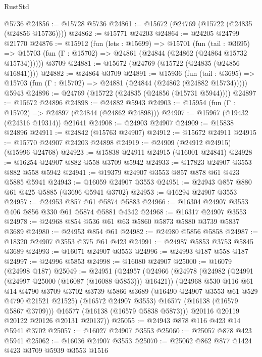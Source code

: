 \begin{lexlean}{RustStd}
\begin{coremodule}
    @5736
@24856 := @15728 @5736
@24861 := @15672 (@24769 (@15722 (@24835 (@24856 @15736))))
@24862 := @15771 @24203
@24864 := @24205 @24799 @21770
@24876 := @15912
    (fun (lets : @15699) =>
    @15701
      (fun (tail : @3695) =>
      @15703 (fun (Γ : @15702) => @24861 (@24844 (@24862 (@24864 @15732 @15734))))))
    @3709
@24881 := @15672 (@24769 (@15722 (@24835 (@24856 @16841))))
@24882 := @24864 @3709
@24891 := @15936
    (fun (tail : @3695) => @15703 (fun (Γ : @15702) => @24881 (@24844 (@24862 (@24882 @15734)))))
    @5943
@24896 := @24769 (@15722 (@24835 (@24856 (@15731 @5944))))
@24897 := @15672 @24896
@24898 := @24882 @5943
@24903 := @15954 (fun (Γ : @15702) => @24897 (@24844 (@24862 @24898)))
@24907 := @15967 (@19432 (@24316 @19314)) @21641
@24908 := @24903 @24907
@24909 := @15838 @24896
@24911 := @24842 (@15763 @24907)
@24912 := @15672 @24911
@24915 := @15770 @24907 @24203 @24898
@24919 := @24909 (@24912 @24915) (@15996 @24768)
@24923 := @15838 @24911 @24915 (@16001 @24841)
@24928 := @16254 @24907 @882 @558 @3709 @5942
@24933 := @17823 @24907 @3553 @882 @558 @5942
@24941 := @19379 @24907 @3553 @857 @878 @61 @423 @5885 @5941
@24943 := @16059 @24907 @3553
@24951 := @24943 @857 @880 @61 @425 @5885 (@3696 @5941 @3702)
@24953 := @16294 @24907 @3553
@24957 := @24953 @857 @61 @5874 @5883
@24966 := @16304 @24907 @3553 @406 @856 @330 @61 @5874 @5881 @4342
@24968 := @16317 @24907 @3553
@24978 := @24968 @854 @536 @61 @63 @5860 @5873 @5880 @3739 @5837 @3689
@24980 := @24953 @854 @61
@24982 := @24980 @5856 @5858
@24987 := @18320 @24907 @3553 @375 @61 @423
@24991 := @24987 @5853 @3753 @5845 @3689
@24993 := @16071 @24907 @3553
@24996 := @24993 @187 @558 @187
@24997 := @24996 @5853
@24998 := @16080 @24907
@25000 := @16079 (@24998 @187)
@25049 := @24951
    (@24957
      (@24966
        (@24978
          (@24982 (@24991 (@24997 @25000 (@16087 (@16088 @5853))) @16421))
          (@24968
            @530
            @116
            @61
            @14
            @4790
            @3709
            @3702
            @3739
            @5866
            @3689
            (@16490 @24907 @3553 @61 @529 @4790 @21521 @21525)
            (@16572 @24907 @3553)
            @16577
            (@16138 (@16579 @5867 @3709)))
          @16577
          (@16138 (@16579 @5838 @5873)))
        @20116
        @20119
        @20122
        @20126
        @20131
        @20137))
@25055 := @24943 @878 @116 @423 @14 @5941 @3702
@25057 := @16027 @24907 @3553
@25060 := @25057 @878 @423 @5941
@25062 := @16036 @24907 @3553
@25070 := @25062 @862 @877 @1424 @423 @3709 @5939 @3553 @1516

\end{coremodule}
\end{lexlean}
